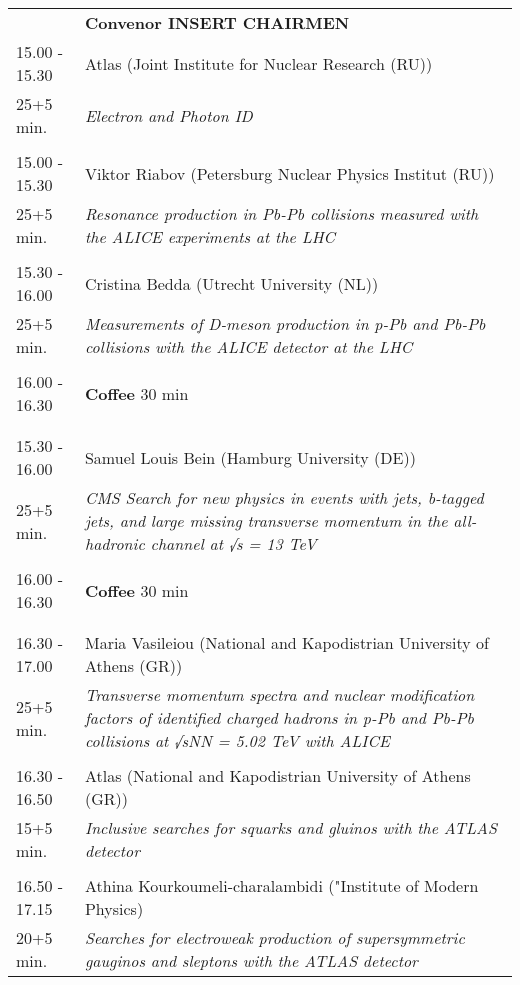 \begin{longtable}{p{3cm}p{13cm}}
&\hfill {\bf Convenor INSERT CHAIRMEN }\\ 
15.00 - 15.30 & Atlas (Joint Institute for  Nuclear Research (RU))\\ 
25+5 min. & {\it Electron and Photon ID}\\ 
 & \\ 
15.00 - 15.30 & Viktor Riabov (Petersburg Nuclear Physics Institut (RU))\\ 
25+5 min. & {\it Resonance production in Pb-Pb collisions measured with the ALICE experiments at the LHC}\\ 
 & \\ 
15.30 - 16.00 & Cristina Bedda (Utrecht University (NL))\\ 
25+5 min. & {\it Measurements of D-meson production in p-Pb and Pb-Pb collisions with the ALICE detector at the LHC}\\ 
 & \\ 
16.00 - 16.30 & {\bf Coffee} \hfill 30 min \\ 
 & \\ 
 & \\ 
15.30 - 16.00 & Samuel Louis Bein (Hamburg University (DE))\\ 
25+5 min. & {\it CMS Search for new physics in events with jets, b-tagged jets, and large missing transverse momentum in the all-hadronic channel at √s = 13 TeV}\\ 
 & \\ 
16.00 - 16.30 & {\bf Coffee} \hfill 30 min \\ 
 & \\ 
 & \\ 
16.30 - 17.00 & Maria Vasileiou (National and Kapodistrian University of Athens (GR))\\ 
25+5 min. & {\it Transverse momentum spectra and nuclear modification factors of identified charged hadrons in p-Pb and Pb-Pb collisions at √sNN  = 5.02 TeV with ALICE}\\ 
 & \\ 
16.30 - 16.50 & Atlas (National and Kapodistrian University of Athens (GR))\\ 
15+5 min. & {\it Inclusive searches for squarks and gluinos with the ATLAS detector}\\ 
 & \\ 
16.50 - 17.15 & Athina Kourkoumeli-charalambidi ("Institute of Modern Physics)\\ 
20+5 min. & {\it Searches for electroweak production of supersymmetric gauginos and sleptons with the ATLAS detector}\\ 

\end{longtable}
